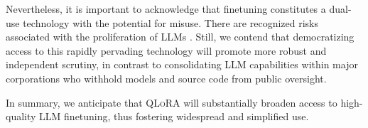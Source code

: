 Nevertheless, it is important to acknowledge that finetuning constitutes a dual-use technology with the potential for misuse. There are recognized risks associated with the proliferation of LLMs \citep{bommasani2021opportunities,bender2021dangers}. Still, we contend that democratizing access to this rapidly pervading technology will promote more robust and independent scrutiny, in contrast to consolidating LLM capabilities within major corporations who withhold models and source code from public oversight.

In summary, we anticipate that \textsc{QLoRA} will substantially broaden access to high-quality LLM finetuning, thus fostering widespread and simplified use.